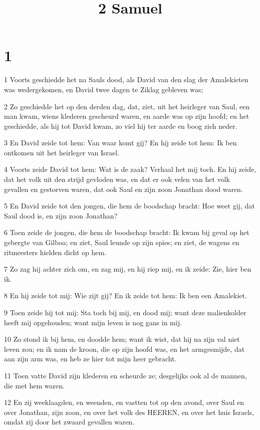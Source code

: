 

\title{2 Samuel}



\chapter{1}

\par 1 Voorts geschiedde het na Sauls dood, als David van den slag der Amalekieten was wedergekomen, en David twee dagen te Ziklag gebleven was;
\par 2 Zo geschiedde het op den derden dag, dat, ziet, uit het heirleger van Saul, een man kwam, wiens klederen gescheurd waren, en aarde was op zijn hoofd; en het geschiedde, als hij tot David kwam, zo viel hij ter aarde en boog zich neder.
\par 3 En David zeide tot hem: Van waar komt gij? En hij zeide tot hem: Ik ben ontkomen uit het heirleger van Israel.
\par 4 Voorts zeide David tot hem: Wat is de zaak? Verhaal het mij toch. En hij zeide, dat het volk uit den strijd gevloden was, en dat er ook velen van het volk gevallen en gestorven waren, dat ook Saul en zijn zoon Jonathan dood waren.
\par 5 En David zeide tot den jongen, die hem de boodschap bracht: Hoe weet gij, dat Saul dood is, en zijn zoon Jonathan?
\par 6 Toen zeide de jongen, die hem de boodschap bracht: Ik kwam bij geval op het gebergte van Gilboa; en ziet, Saul leunde op zijn spies; en ziet, de wagens en ritmeesters hielden dicht op hem.
\par 7 Zo zag hij achter zich om, en zag mij, en hij riep mij, en ik zeide: Zie, hier ben ik.
\par 8 En hij zeide tot mij: Wie zijt gij? En ik zeide tot hem: Ik ben een Amalekiet.
\par 9 Toen zeide hij tot mij: Sta toch bij mij, en dood mij; want deze malienkolder heeft mij opgehouden; want mijn leven is nog gans in mij.
\par 10 Zo stond ik bij hem, en doodde hem; want ik wist, dat hij na zijn val niet leven zou; en ik nam de kroon, die op zijn hoofd was, en het armgesmijde, dat aan zijn arm was, en heb ze hier tot mijn heer gebracht.
\par 11 Toen vatte David zijn klederen en scheurde ze; desgelijks ook al de mannen, die met hem waren.
\par 12 En zij weeklaagden, en weenden, en vastten tot op den avond, over Saul en over Jonathan, zijn zoon, en over het volk des HEEREN, en over het huis Israels, omdat zij door het zwaard gevallen waren.
